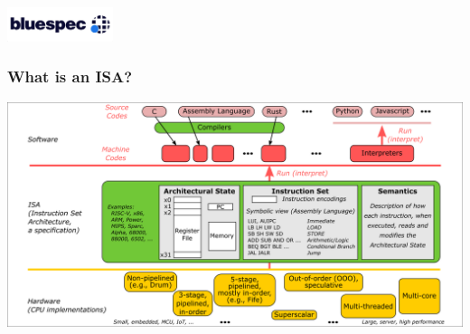 



\date{L2: Overview of the RISC-V ISA}





\begin{frame}
 \titlepage

 \begin{center}
  \includegraphics[height=1cm]{../Figures/Bluespec_Logo_2022-10}
 \end{center}
\end{frame}


\begin{frame}
\frametitle{What is an ISA?}

\begin{center}
\includegraphics[height=0.8\textheight]{../Figures/Fig_What_is_an_ISA}
\end{center}

\end{frame}


